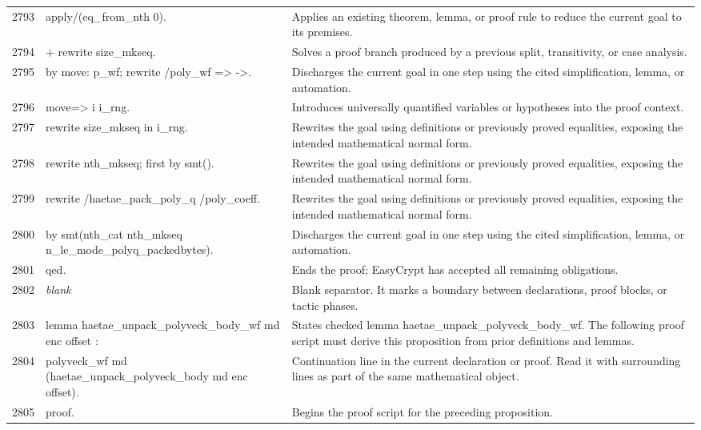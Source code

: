 \documentclass[10pt]{article}
\begin{document}
\begin{longtable}{r L{0.53\textwidth} L{0.37\textwidth}}
2793 & {\ttfamily\scriptsize apply/(eq\_from\_nth 0).} & Applies an existing theorem, lemma, or proof rule to reduce the current goal to its premises. \\
2794 & {\ttfamily\scriptsize + rewrite size\_mkseq.} & Solves a proof branch produced by a previous split, transitivity, or case analysis. \\
2795 & {\ttfamily\scriptsize   by move: p\_wf; rewrite /poly\_wf => ->.} & Discharges the current goal in one step using the cited simplification, lemma, or automation. \\
2796 & {\ttfamily\scriptsize move=> i i\_rng.} & Introduces universally quantified variables or hypotheses into the proof context. \\
2797 & {\ttfamily\scriptsize rewrite size\_mkseq in i\_rng.} & Rewrites the goal using definitions or previously proved equalities, exposing the intended mathematical normal form. \\
2798 & {\ttfamily\scriptsize rewrite nth\_mkseq; first by smt().} & Rewrites the goal using definitions or previously proved equalities, exposing the intended mathematical normal form. \\
2799 & {\ttfamily\scriptsize rewrite /haetae\_pack\_poly\_q /poly\_coeff.} & Rewrites the goal using definitions or previously proved equalities, exposing the intended mathematical normal form. \\
2800 & {\ttfamily\scriptsize by smt(nth\_cat nth\_mkseq n\_le\_mode\_polyq\_packedbytes).} & Discharges the current goal in one step using the cited simplification, lemma, or automation. \\
2801 & {\ttfamily\scriptsize qed.} & Ends the proof; EasyCrypt has accepted all remaining obligations. \\
2802 & {\ttfamily\scriptsize \emph{blank}} & Blank separator.  It marks a boundary between declarations, proof blocks, or tactic phases. \\
2803 & {\ttfamily\scriptsize lemma haetae\_unpack\_polyveck\_body\_wf md enc offset :} & States checked lemma haetae\_unpack\_polyveck\_body\_wf.  The following proof script must derive this proposition from prior definitions and lemmas. \\
2804 & {\ttfamily\scriptsize   polyveck\_wf md (haetae\_unpack\_polyveck\_body md enc offset).} & Continuation line in the current declaration or proof.  Read it with surrounding lines as part of the same mathematical object. \\
2805 & {\ttfamily\scriptsize proof.} & Begins the proof script for the preceding proposition. \\

\end{longtable}
\end{document}
